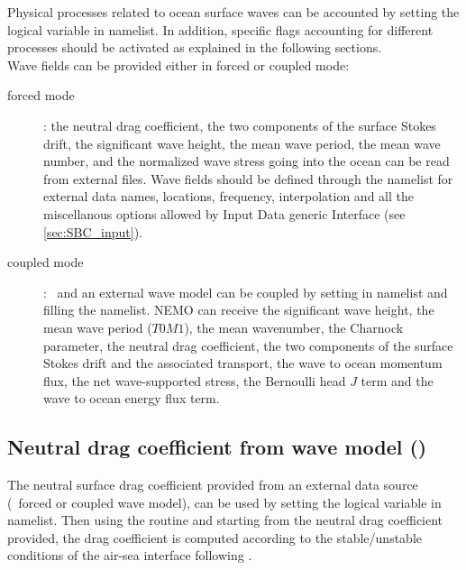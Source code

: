 \documentclass[../main/NEMO_manual]{subfiles}
\begin{document}
Physical processes related to ocean surface waves can be accounted by setting the logical variable
 in  namelist. In addition, specific flags accounting for
different processes should be activated as explained in the following sections.\\

Wave fields can be provided either in forced or coupled mode:
\begin{description}
\item [forced mode]: the neutral drag coefficient, the two components of the surface Stokes drift, the significant wave height, the mean wave period, the mean wave number, and the normalized
wave stress going into the ocean can be read from external files. Wave fields should be defined through the  namelist
for external data names, locations, frequency, interpolation and all the miscellanous options allowed by
Input Data generic Interface (see \autoref{sec:SBC_input}).

\item [coupled mode]: \NEMO\ and an external wave model can be coupled by setting 
in  namelist and filling the  namelist. NEMO can receive the significant wave height, the mean wave period ($T0M1$), the mean wavenumber, the Charnock parameter, the neutral drag coefficient, the two components of the surface Stokes drift and the associated transport, the wave to ocean momentum flux, the net wave-supported stress, the Bernoulli head $J$ term and the wave to ocean energy flux term.
\end{description}


\subsection[Neutral drag coefficient from wave model (\forcode{ln_cdgw})]{Neutral drag coefficient from wave model (\protect{})}
\label{subsec:SBC_wave_cdgw}

The neutral surface drag coefficient provided from an external data source (\ie\ forced or coupled wave model),
can be used by setting the logical variable  in  namelist.
Then using the routine  and starting from the neutral drag coefficient provided,
the drag coefficient is computed according to the stable/unstable conditions of the
air-sea interface following \citet{large.yeager_trpt04}.
\end{document}
